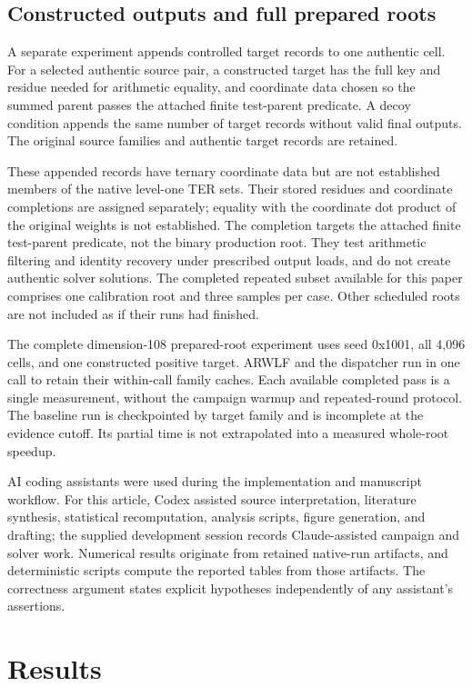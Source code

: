 \documentclass[manuscript,screen,review]{acmart}
\begin{document}
\subsection{Constructed outputs and full prepared roots}
A separate experiment appends controlled target records to one authentic cell. For a selected authentic source pair, a constructed target has the full key and residue needed for arithmetic equality, and coordinate data chosen so the summed parent passes the attached finite test-parent predicate. A decoy condition appends the same number of target records without valid final outputs. The original source families and authentic target records are retained.

These appended records have ternary coordinate data but are not established members of the native level-one TER sets. Their stored residues and coordinate completions are assigned separately; equality with the coordinate dot product of the original weights is not established. The completion targets the attached finite test-parent predicate, not the binary production root. They test arithmetic filtering and identity recovery under prescribed output loads, and do not create authentic solver solutions. The completed repeated subset available for this paper comprises one calibration root and three samples per case. Other scheduled roots are not included as if their runs had finished.

The complete dimension-108 prepared-root experiment uses seed 0x1001, all 4,096 cells, and one constructed positive target. ARWLF and the dispatcher run in one call to retain their within-call family caches. Each available completed pass is a single measurement, without the campaign warmup and repeated-round protocol. The baseline run is checkpointed by target family and is incomplete at the evidence cutoff. Its partial time is not extrapolated into a measured whole-root speedup.

AI coding assistants were used during the implementation and manuscript workflow. For this article, Codex assisted source interpretation, literature synthesis, statistical recomputation, analysis scripts, figure generation, and drafting; the supplied development session records Claude-assisted campaign and solver work. Numerical results originate from retained native-run artifacts, and deterministic scripts compute the reported tables from those artifacts. The correctness argument states explicit hypotheses independently of any assistant's assertions.

\section{Results}
\end{document}
